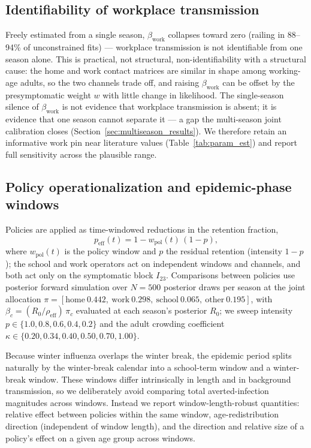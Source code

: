 \documentclass[12pt]{article}
\theoremstyle{plain}
\theoremstyle{remark}
\theoremstyle{definition}
\begin{document}
\subsection{Identifiability of workplace transmission}
\label{sec:ident}
Freely estimated from a single season, $\beta_{\mathrm{work}}$ collapses toward zero (railing in 88--94\% of unconstrained fits) --- workplace transmission is not identifiable from one season alone. This is practical, not structural, non-identifiability with a structural cause: the home and work contact matrices are similar in shape among working-age adults, so the two channels trade off, and raising $\beta_{\mathrm{work}}$ can be offset by the presymptomatic weight $w$ with little change in likelihood. The single-season silence of $\beta_{\mathrm{work}}$ is not evidence that workplace transmission is absent; it is evidence that one season cannot separate it --- a gap the multi-season joint calibration closes (Section~\ref{sec:multiseason_results}). We therefore retain an informative work pin near literature values (Table~\ref{tab:param_est}) and report full sensitivity across the plausible range.

\subsection{Policy operationalization and epidemic-phase windows}
\label{sec:policy}
Policies are applied as time-windowed reductions in the retention fraction,
\begin{equation}
p_{\mathrm{eff}}(t) = 1 - w_{\mathrm{pol}}(t)\,(1 - p),
\end{equation}
where $w_{\mathrm{pol}}(t)$ is the policy window and $p$ the residual retention (intensity $1 - p$); the school and work operators act on independent windows and channels, and both act only on the symptomatic block $I_{23}$. Comparisons between policies use posterior forward simulation over $N = 500$ posterior draws per season at the joint allocation $\pi = [\mathrm{home}\ 0.442,\ \mathrm{work}\ 0.298,\ \mathrm{school}\ 0.065,\ \mathrm{other}\ 0.195]$, with $\beta_c = (R_0 / \rho_{\mathrm{eff}})\,\pi_c$ evaluated at each season's posterior $R_0$; we sweep intensity $p \in \{1.0, 0.8, 0.6, 0.4, 0.2\}$ and the adult crowding coefficient $\kappa \in \{0.20, 0.34, 0.40, 0.50, 0.70, 1.00\}$.

Because winter influenza overlaps the winter break, the epidemic period splits naturally by the winter-break calendar into a school-term window and a winter-break window. These windows differ intrinsically in length and in background transmission, so we deliberately avoid comparing total averted-infection magnitudes across windows. Instead we report window-length-robust quantities: relative effect between policies within the same window, age-redistribution direction (independent of window length), and the direction and relative size of a policy's effect on a given age group across windows.
\end{document}
